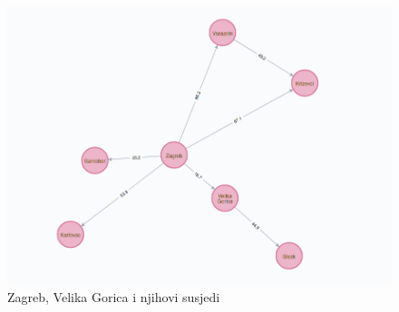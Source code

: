\documentclass[10pt]{scrartcl}
\begin{document}
\begin{figure}[H]
\caption{Zagreb, Velika Gorica i njihovi susjedi}
\begin{center}
\includegraphics[scale=0.3]{Zg-VG}
\end{center}
\end{figure}
\end{document}
